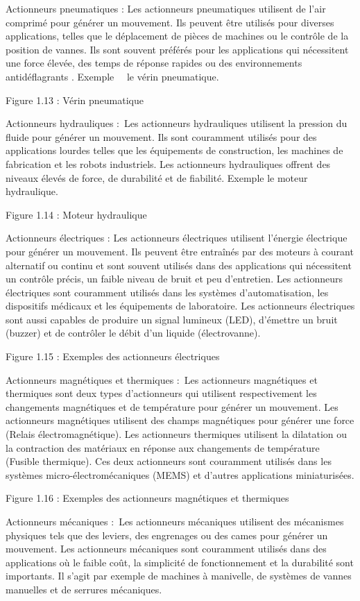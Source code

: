 \documentclass{article}
\begin{document}
Actionneurs pneumatiques : Les actionneurs pneumatiques utilisent de l'air comprimé pour générer un mouvement. Ils peuvent être utilisés pour diverses applications, telles que le déplacement de pièces de machines ou le contrôle de la position de vannes. Ils sont souvent préférés pour les applications qui nécessitent une force élevée, des temps de réponse rapides ou des environnements antidéflagrants . Exemple   le vérin pneumatique.

Figure 1.13 : Vérin pneumatique

 Actionneurs hydrauliques : Les actionneurs hydrauliques utilisent la pression du fluide pour générer un mouvement. Ils sont couramment utilisés pour des applications lourdes telles que les équipements de construction, les machines de fabrication et les robots industriels. Les actionneurs hydrauliques offrent des niveaux élevés de force, de durabilité et de fiabilité. Exemple le moteur hydraulique.

Figure 1.14 : Moteur hydraulique

Actionneurs électriques : Les actionneurs électriques utilisent l'énergie électrique pour générer un mouvement. Ils peuvent être entraînés par des moteurs à courant alternatif ou continu et sont souvent utilisés dans des applications qui nécessitent un contrôle précis, un faible niveau de bruit et peu d'entretien. Les actionneurs électriques sont couramment utilisés dans les systèmes d'automatisation, les dispositifs médicaux et les équipements de laboratoire. Les actionneurs électriques sont aussi capables de produire un signal lumineux (LED), d’émettre un bruit (buzzer) et de contrôler le débit d’un liquide (électrovanne). 

Figure 1.15 : Exemples des actionneurs électriques

Actionneurs magnétiques et thermiques : Les actionneurs magnétiques et thermiques sont deux types d'actionneurs qui utilisent respectivement les changements magnétiques et de température pour générer un mouvement. Les actionneurs magnétiques utilisent des champs magnétiques pour générer une force (Relais électromagnétique). Les actionneurs thermiques utilisent la dilatation ou la contraction des matériaux en réponse aux changements de température (Fusible thermique). Ces deux actionneurs sont couramment utilisés dans les systèmes micro-électromécaniques (MEMS) et d'autres applications miniaturisées. 

Figure 1.16 : Exemples des actionneurs magnétiques et thermiques

Actionneurs mécaniques : Les actionneurs mécaniques utilisent des mécanismes physiques tels que des leviers, des engrenages ou des cames pour générer un mouvement. Les actionneurs mécaniques sont couramment utilisés dans des applications où le faible coût, la simplicité de fonctionnement et la durabilité sont importants. Il s'agit par exemple de machines à manivelle, de systèmes de vannes manuelles et de serrures mécaniques.
\end{document}
